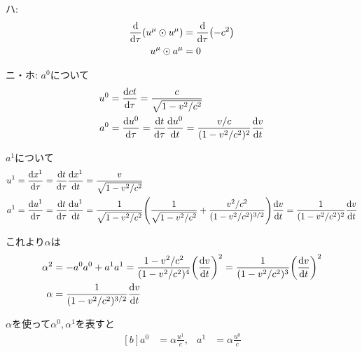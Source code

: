 \documentclass[../../sp_2015.tex]{subfiles}
\begin{document}
ハ:
\begin{equation}\begin{aligned}[b]
    \dv{\tau} (u^\mu\odot u^\mu) &= \dv{\tau}(-c^2)\\
        u^\mu\odot a^\mu &= 0
\end{aligned}\end{equation}

ニ・ホ:
\(a^0\)について
\begin{equation}\begin{aligned}[b]
    u^0 &= \dv{ct}{\tau} =\frac{c}{\sqrt{1-v^2/c^2}}\\
    a^0 &= \dv{u^0}{\tau} = \dv{t}{\tau}\dv{u^0}{t}
        = \frac{v/c}{(1-v^2/c^2)^{2}}\dv{v}{t}
\end{aligned}\end{equation}

\(a^1\)について
\begin{equation}\begin{aligned}[b]
    u^1 &= \dv{x^1}{\tau} = \dv{t}{\tau}\dv{x^1}{t} = \frac{v}{\sqrt{1-v^2/c^2}}\\
    a^1 &= \dv{u^1}{\tau} = \dv{t}{\tau}\dv{u^1}{t}
        = \frac{1}{\sqrt{1-v^2/c^2}}\qty(\frac{1}{\sqrt{1-v^2/c^2}}+\frac{v^2/c^2}{(1-v^2/c^2)^{3/2}})\dv{v}{t}
        = \frac{1}{(1-v^2/c^2)^2}\dv{v}{t}
\end{aligned}\end{equation}

これより\(\alpha\)は
\begin{equation}\begin{aligned}[b]
    \alpha^2 &= -a^0a^0+a^1a^1
    = \frac{1-v^2/c^2}{(1-v^2/c^2)^4}\qty(\dv{v}{t})^2
    = \frac{1}{(1-v^2/c^2)^3}\qty(\dv{v}{t})^2\\
    \alpha &= \frac{1}{(1-v^2/c^2)^{3/2}}\dv{v}{t}
\end{aligned}\end{equation}

\(\alpha\)を使って\(\alpha^0,\alpha^1\)を表すと
\begin{equation}\begin{aligned}[b]
    a^0 &= \alpha \frac{u^1}{c}, &
    a^1 &= \alpha \frac{u^0}{c}
\end{aligned}\end{equation}
\end{document}
